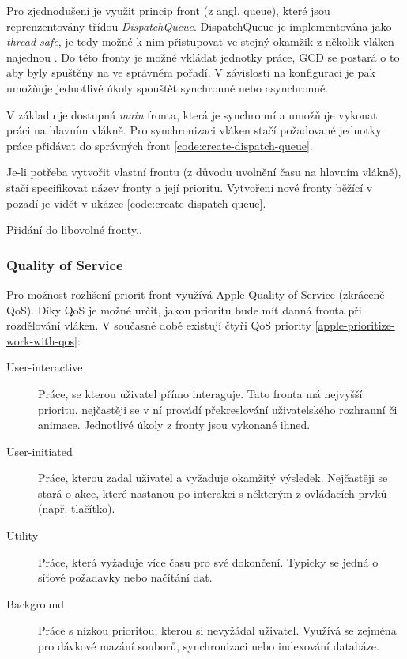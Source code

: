 Pro zjednodušení je využit princip front (z angl. queue), které jsou reprenzentovány třídou \textit{DispatchQueue}.
DispatchQueue je implementována jako \textit{thread-safe}, je tedy možné k nim přistupovat ve stejný okamžik z několik vláken najednou \cite{apple-concurrency-programming-guide}.
Do této fronty je možné vkládat jednotky práce, GCD se postará o to aby byly spuštěny na ve správném pořadí.
V závislosti na konfiguraci je pak umožňuje jednotlivé úkoly spouštět synchronně nebo asynchronně.

V základu je dostupná \textit{main} fronta, která je synchronní a umožňuje vykonat práci na hlavním vlákně.
Pro synchronizaci vláken stačí požadované jednotky práce přidávat do správných front  \ref{code:create-dispatch-queue}.

Je-li potřeba vytvořit vlastní frontu (z důvodu uvolnění času na hlavním vlákně), stačí specifikovat název fronty a její prioritu.
Vytvoření nové fronty běžící v pozadí je vidět v ukázce \ref{code:create-dispatch-queue}.


Přidání do libovolné fronty..

\subsubsection*{Quality of Service}

Pro možnost rozlišení priorit front využívá Apple Quality of Service (zkráceně QoS).
Díky QoS je možné určit, jakou prioritu bude mít danná fronta při rozdělování vláken.
V současné době existují čtyři QoS priority \ref{apple-prioritize-work-with-qos}:

\begin{description}
  \item[User-interactive] Práce, se kterou uživatel přímo interaguje.
  Tato fronta má nejvyšší prioritu, nejčastěji se v ní provádí překreslování uživatelského rozhranní či animace.
  Jednotlivé úkoly z fronty jsou vykonané ihned.
  \item[User-initiated] Práce, kterou zadal uživatel a vyžaduje okamžitý výsledek.
  Nejčastěji se stará o akce, které nastanou po interakci s některým z ovládacích prvků (např. tlačítko).
  \item[Utility] Práce, která vyžaduje více času pro své dokončení.
  Typicky se jedná o síťové požadavky nebo načítání dat.
  \item[Background] Práce s nízkou prioritou, kterou si nevyžádal uživatel.
  Využívá se zejména pro dávkové mazání souborů, synchronizaci nebo indexování databáze.
\end{description}

